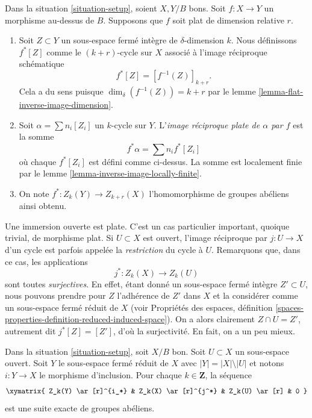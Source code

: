 \begin{definition}
\label{definition-flat-pullback}
Dans la situation \ref{situation-setup}, soient $X, Y/B$ bons. Soit $f :
X \to Y$ un morphisme au-dessus de $B$. Supposons que $f$ soit plat de dimension
relative $r$.
\begin{enumerate}
\item Soit $Z \subset Y$ un sous-espace fermé intègre de $\delta$-dimension
$k$. Nous définissons $f^*[Z]$ comme le $(k+r)$-cycle sur $X$ associé à
l'image réciproque schématique
$$
f^*[Z] = [f^{-1}(Z)]_{k+r}.
$$
Cela a du sens puisque $\dim_\delta(f^{-1}(Z)) = k + r$ par le lemme
\ref{lemma-flat-inverse-image-dimension}.
\item Soit $\alpha = \sum n_i [Z_i]$ un $k$-cycle sur $Y$. L'{\it image
réciproque plate de $\alpha$ par $f$} est la somme
$$
f^* \alpha = \sum n_i f^*[Z_i]
$$
où chaque $f^*[Z_i]$ est défini comme ci-dessus. La somme est localement finie
par le lemme \ref{lemma-inverse-image-locally-finite}.
\item On note $f^* : Z_k(Y) \to Z_{k + r}(X)$ l'homomorphisme de groupes abéliens
ainsi obtenu.
\end{enumerate}
\end{definition}

\noindent
Une immersion ouverte est plate. C'est un cas particulier important, quoique
trivial, de morphisme plat. Si $U \subset X$ est ouvert, l'image réciproque par
$j : U \to X$ d'un cycle est parfois appelée la {\it restriction} du cycle à
$U$. Remarquons que, dans ce cas, les applications
$$
j^* : Z_k(X) \longrightarrow Z_k(U)
$$
sont toutes {\it surjectives}. En effet, étant donné un sous-espace fermé
intègre $Z' \subset U$, nous pouvons prendre pour $Z$ l'adhérence de
$Z'$ dans $X$ et la considérer comme un sous-espace fermé réduit de $X$ (voir
Propriétés des espaces, définition
\ref{spaces-properties-definition-reduced-induced-space}). On a alors clairement
$Z \cap U = Z'$, autrement dit $j^*[Z] = [Z']$, d'où la surjectivité. En fait,
on a un peu mieux.

\begin{lemma}
\label{lemma-exact-sequence-open}
Dans la situation \ref{situation-setup}, soit $X/B$ bon. Soit $U
\subset X$ un sous-espace ouvert. Soit $Y$ le sous-espace fermé réduit de $X$
avec $|Y| = |X| \setminus |U|$ et notons $i : Y \to X$ le morphisme
d'inclusion. Pour chaque $k \in \mathbf{Z}$, la séquence
$$
\xymatrix{
Z_k(Y) \ar[r]^{i_*} & Z_k(X) \ar[r]^{j^*} & Z_k(U) \ar[r] & 0
}
$$
est une suite exacte de groupes abéliens.
\end{lemma}

